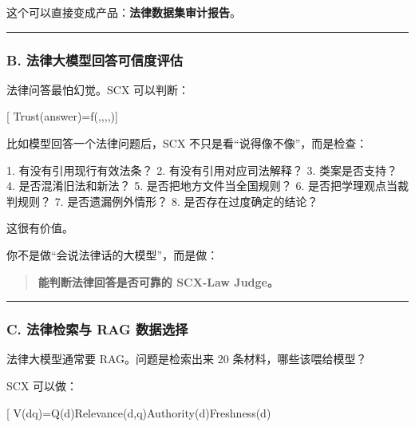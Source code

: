 \documentclass[
  12pt,
]{ctexart}
\newenvironment{Shaded}{}{}
\newcommand{\NormalTok}[1]{#1}
\begin{document}
这个可以直接变成产品：\textbf{法律数据集审计报告}。

\begin{center}\rule{0.5\linewidth}{0.5pt}\end{center}

\subsubsection{B.
法律大模型回答可信度评估}\label{b.-ux6cd5ux5f8bux5927ux6a21ux578bux56deux7b54ux53efux4fe1ux5ea6ux8bc4ux4f30}

法律问答最怕幻觉。SCX 可以判断：

{[}
Trust(answer)=f(,,,,){]}

比如模型回答一个法律问题后，SCX 不只是看``说得像不像''，而是检查：

\begin{Shaded}
\begin{Highlighting}[]
\NormalTok{1. 有没有引用现行有效法条？}
\NormalTok{2. 有没有引用对应司法解释？}
\NormalTok{3. 类案是否支持？}
\NormalTok{4. 是否混淆旧法和新法？}
\NormalTok{5. 是否把地方文件当全国规则？}
\NormalTok{6. 是否把学理观点当裁判规则？}
\NormalTok{7. 是否遗漏例外情形？}
\NormalTok{8. 是否存在过度确定的结论？}
\end{Highlighting}
\end{Shaded}

这很有价值。

你不是做``会说法律话的大模型''，而是做：

\begin{quote}
\textbf{能判断法律回答是否可靠的 SCX-Law Judge。}
\end{quote}

\begin{center}\rule{0.5\linewidth}{0.5pt}\end{center}

\subsubsection{C. 法律检索与 RAG
数据选择}\label{c.-ux6cd5ux5f8bux68c0ux7d22ux4e0e-rag-ux6570ux636eux9009ux62e9}

法律大模型通常要 RAG。问题是检索出来 20 条材料，哪些该喂给模型？

SCX 可以做：

{[}
V(d\mid q)=Q(d)\cdot Relevance(d,q)\cdot Authority(d)\cdot Freshness(d)\cdot [1-Redundancy(d)]{]}
\end{document}
